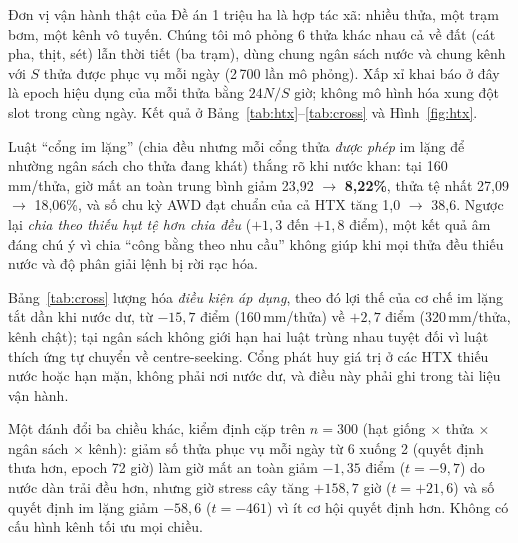 \documentclass[10pt]{article}
\begin{document}
Đơn vị vận hành thật của Đề án 1 triệu ha là hợp tác xã: nhiều thửa, một trạm bơm, một kênh vô tuyến. Chúng tôi mô phỏng 6 thửa khác nhau cả về đất (cát pha, thịt, sét) lẫn thời tiết (ba trạm), dùng chung ngân sách nước và chung kênh với $S$ thửa được phục vụ mỗi ngày (2\,700 lần mô phỏng). Xấp xỉ khai báo ở đây là epoch hiệu dụng của mỗi thửa bằng $24N/S$ giờ; không mô hình hóa xung đột slot trong cùng ngày. Kết quả ở Bảng~\ref{tab:htx}--\ref{tab:cross} và Hình~\ref{fig:htx}.

\begin{table}[t]
\centering
\caption{Hợp tác xã sáu thửa ở kênh severe với ba luật phân bổ ngân sách. Hệ số Gini đo bất bình đẳng giờ mất an toàn giữa các thửa, giá trị 0 nghĩa là phân bổ đều.}
\label{tab:htx}
\scriptsize
\resizebox{\textwidth}{!}{}
\end{table}

Luật ``cổng im lặng'' (chia đều nhưng mỗi cổng thửa \emph{được phép} im lặng để nhường ngân sách cho thửa đang khát) thắng rõ khi nước khan: tại 160\,mm/thửa, giờ mất an toàn trung bình giảm 23,92 $\to$ \textbf{8,22\%}, thửa tệ nhất 27,09 $\to$ 18,06\%, và số chu kỳ AWD đạt chuẩn của cả HTX tăng 1,0 $\to$ 38,6. Ngược lại \emph{chia theo thiếu hụt tệ hơn chia đều} ($+1{,}3$ đến $+1{,}8$ điểm), một kết quả âm đáng chú ý vì chia ``công bằng theo nhu cầu'' không giúp khi mọi thửa đều thiếu nước và độ phân giải lệnh bị rời rạc hóa.

\begin{table}[t]
\centering
\caption{Điểm chéo, với $\Delta$ là hiệu giữa giờ mất an toàn của luật cổng im lặng và của luật chia đều ở kênh severe. \textbf{Giá trị âm nghĩa là cơ chế tốt hơn}; đây là điều kiện áp dụng chứ không phải ngoại lệ.}
\label{tab:cross}
\scriptsize

\end{table}

Bảng~\ref{tab:cross} lượng hóa \emph{điều kiện áp dụng}, theo đó lợi thế của cơ chế im lặng tắt dần khi nước dư, từ $-15{,}7$ điểm (160\,mm/thửa) về $+2{,}7$ điểm (320\,mm/thửa, kênh chật); tại ngân sách không giới hạn hai luật trùng nhau tuyệt đối vì luật thích ứng tự chuyển về centre-seeking. Cổng phát huy giá trị ở các HTX thiếu nước hoặc hạn mặn, không phải nơi nước dư, và điều này phải ghi trong tài liệu vận hành.

Một đánh đổi ba chiều khác, kiểm định cặp trên $n=300$ (hạt giống $\times$ thửa $\times$ ngân sách $\times$ kênh): giảm số thửa phục vụ mỗi ngày từ 6 xuống 2 (quyết định thưa hơn, epoch 72 giờ) làm giờ mất an toàn giảm $-1{,}35$ điểm ($t=-9{,}7$) do nước dàn trải đều hơn, nhưng giờ stress cây tăng $+158{,}7$ giờ ($t=+21{,}6$) và số quyết định im lặng giảm $-58{,}6$ ($t=-461$) vì ít cơ hội quyết định hơn. Không có cấu hình kênh tối ưu mọi chiều.
\end{document}
